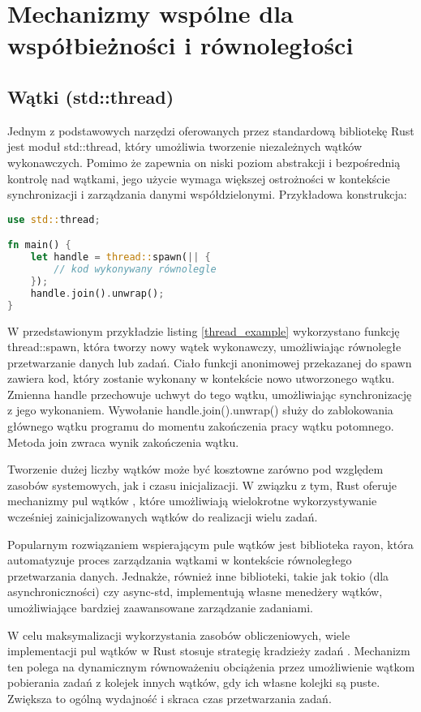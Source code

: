 \section{Mechanizmy wspólne dla współbieżności i równoległości}
\subsection{Wątki (std::thread)}
Jednym z podstawowych narzędzi oferowanych przez standardową bibliotekę Rust jest moduł std::thread, który umożliwia tworzenie niezależnych wątków wykonawczych. Pomimo że zapewnia on niski poziom abstrakcji i bezpośrednią kontrolę nad wątkami, jego użycie wymaga większej ostrożności w kontekście synchronizacji i zarządzania danymi współdzielonymi.
Przykładowa konstrukcja:
\begin{lstlisting}[language=Rust, caption=Przykład tworzenia wątku, label=thread_example]
use std::thread;

fn main() {
    let handle = thread::spawn(|| {
        // kod wykonywany równolegle
    });
    handle.join().unwrap();
}
\end{lstlisting}
W przedstawionym przykładzie listing \ref{thread_example} wykorzystano funkcję thread::spawn, która tworzy nowy wątek wykonawczy, umożliwiając równoległe przetwarzanie danych lub zadań. Ciało funkcji anonimowej przekazanej do spawn zawiera kod, który zostanie wykonany w kontekście nowo utworzonego wątku. Zmienna handle przechowuje uchwyt do tego wątku, umożliwiając synchronizację z jego wykonaniem.
Wywołanie handle.join().unwrap() służy do zablokowania głównego wątku programu do momentu zakończenia pracy wątku potomnego. Metoda join zwraca wynik zakończenia wątku.

Tworzenie dużej liczby wątków może być kosztowne zarówno pod względem zasobów systemowych, jak i czasu inicjalizacji. W związku z tym, Rust oferuje mechanizmy pul wątków , które umożliwiają wielokrotne wykorzystywanie wcześniej zainicjalizowanych wątków do realizacji wielu zadań.

Popularnym rozwiązaniem wspierającym pule wątków jest biblioteka rayon, która automatyzuje proces zarządzania wątkami w kontekście równoległego przetwarzania danych. Jednakże, również inne biblioteki, takie jak tokio (dla asynchroniczności) czy async-std, implementują własne menedżery wątków, umożliwiające bardziej zaawansowane zarządzanie zadaniami.

W celu maksymalizacji wykorzystania zasobów obliczeniowych, wiele implementacji pul wątków w Rust stosuje strategię kradzieży zadań . Mechanizm ten polega na dynamicznym równoważeniu obciążenia przez umożliwienie wątkom pobierania zadań z kolejek innych wątków, gdy ich własne kolejki są puste. Zwiększa to ogólną wydajność i skraca czas przetwarzania zadań.

